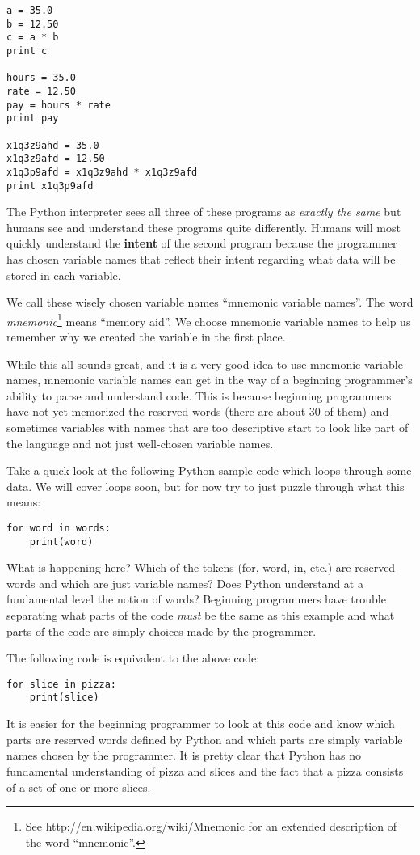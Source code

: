 \beforeverb
\begin{verbatim}
a = 35.0
b = 12.50
c = a * b
print c

hours = 35.0
rate = 12.50
pay = hours * rate
print pay

x1q3z9ahd = 35.0
x1q3z9afd = 12.50
x1q3p9afd = x1q3z9ahd * x1q3z9afd
print x1q3p9afd
\end{verbatim}
\afterverb
%
The Python interpreter sees all three of these programs as \emph{exactly the 
same} but humans see and understand these programs quite differently.  
Humans will most quickly understand the {\bf intent} 
of the second program because the 
programmer has chosen variable names that reflect their intent
regarding what data will be stored in each variable.

We call these wisely chosen variable names ``mnemonic variable names''.  The
word \emph{mnemonic}\footnote{See 
\url{http://en.wikipedia.org/wiki/Mnemonic}
for an extended description of the word ``mnemonic''.} 
means ``memory aid''.
We choose mnemonic variable names to help us remember why we created the variable
in the first place.

While this all sounds great, and it is a very good idea to use mnemonic variable
names, mnemonic variable names can get in the way of a beginning programmer's 
ability to parse and understand code.  This is because beginning programmers 
have not yet memorized the reserved words (there are about 30 of them) and sometimes
variables with names that are too descriptive start to look like 
part of the language and not just well-chosen variable names.

Take a quick look at the following Python sample code which loops through some data. 
We will cover loops soon, but for now try to just puzzle through what this means:

\beforeverb
\begin{verbatim}
for word in words:
    print(word)
\end{verbatim}
\afterverb
%
What is happening here?  Which of the tokens (for, word, in, etc.) are reserved words
and which are just variable names?  Does Python understand at a fundamental level 
the notion of words?  Beginning programmers have 
trouble separating what parts of the
code \emph{must} be the same as this example and what parts of the code are simply
choices made by the programmer.

The following code is equivalent to the above code:

\beforeverb
\begin{verbatim}
for slice in pizza:
    print(slice)
\end{verbatim}
\afterverb
%
It is easier for the beginning programmer to look at this code and know which 
parts are reserved words defined by Python and which parts are simply variable
names chosen by the programmer.  It is pretty clear that Python has no fundamental
understanding of pizza and slices and the fact that a pizza consists of a set
of one or more slices.

